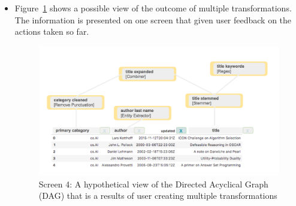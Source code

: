 \documentclass[12pt,letterpaper]{article}
\begin{document}
\begin{itemize}
    \item Figure~\ref{fig::5} shows a possible view of the outcome of multiple transformations. The information is presented on one screen that given user feedback on the actions taken so far.

\begin{figure}[h]
\centering
\includegraphics[scale=.3]{figures/m3/wireframe-screen5.png}
\caption{Screen 4: A hypothetical view of the Directed Acyclical Graph (DAG) that is a results of user creating multiple transformations}
\label{fig::5}
\end{figure}

\end{itemize}
\end{document}
